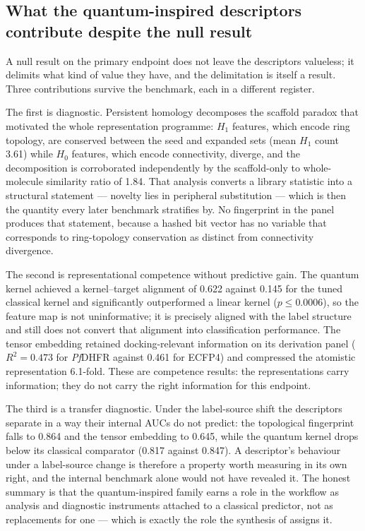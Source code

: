 \subsection{What the quantum-inspired descriptors contribute despite the null result}\label{sec:res_representations_value}

A null result on the primary endpoint does not leave the descriptors valueless; it delimits what kind of value they have, and the delimitation is itself a result. Three contributions survive the benchmark, each in a different register.

The first is diagnostic. Persistent homology decomposes the scaffold paradox that motivated the whole representation programme: $H_1$ features, which encode ring topology, are conserved between the seed and expanded sets (mean $H_1$ count \num{3.61}) while $H_0$ features, which encode connectivity, diverge, and the decomposition is corroborated independently by the scaffold-only to whole-molecule similarity ratio of \num{1.84}. That analysis converts a library statistic into a structural statement --- novelty lies in peripheral substitution --- which is then the quantity every later benchmark stratifies by. No fingerprint in the panel produces that statement, because a hashed bit vector has no variable that corresponds to ring-topology conservation as distinct from connectivity divergence.

The second is representational competence without predictive gain. The quantum kernel achieved a kernel--target alignment of \num{0.622} against \num{0.145} for the tuned classical kernel and significantly outperformed a linear kernel ($p \leq \num{0.0006}$), so the feature map is not uninformative; it is precisely aligned with the label structure and still does not convert that alignment into classification performance. The tensor embedding retained docking-relevant information on its derivation panel ($R^2 = \num{0.473}$ for \emph{Pf}DHFR against \num{0.461} for ECFP4) and compressed the atomistic representation \num{6.1}-fold. These are competence results: the representations carry information; they do not carry the right information for this endpoint.

The third is a transfer diagnostic. Under the label-source shift the descriptors separate in a way their internal AUCs do not predict: the topological fingerprint falls to \num{0.864} and the tensor embedding to \num{0.645}, while the quantum kernel drops below its classical comparator (\num{0.817} against \num{0.847}). A descriptor's behaviour under a label-source change is therefore a property worth measuring in its own right, and the internal benchmark alone would not have revealed it. The honest summary is that the quantum-inspired family earns a role in the workflow as analysis and diagnostic instruments attached to a classical predictor, not as replacements for one --- which is exactly the role the synthesis of  assigns it.


